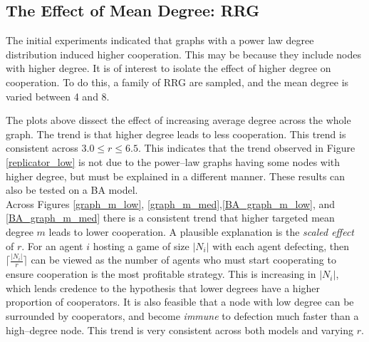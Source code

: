 \subsection{The Effect of Mean Degree: RRG}
The initial experiments indicated that graphs with a power law degree distribution induced higher cooperation. This may be because they include nodes with higher degree. It is of interest to isolate the effect of higher degree on cooperation. To do this, a family of RRG are sampled, and the mean degree is varied between 4 and 8. \\


 \FloatBarrier

 \FloatBarrier

The plots above dissect the effect of increasing average degree across the whole graph. The trend is that higher degree leads to less cooperation. This trend is consistent across $3.0\leq r\leq6.5$. This indicates that the trend observed in Figure \ref{replicator_low} is not due to the power--law graphs having some nodes with higher degree, but must be explained in a different manner. These results can also be tested on a BA model. \\
\FloatBarrier
{}
\FloatBarrier
{}
\FloatBarrier
Across Figures \ref{graph_m_low}, \ref{graph_m_med},\ref{BA_graph_m_low}, and \ref{BA_graph_m_med} there is a consistent trend that higher targeted mean degree $m$ leads to lower cooperation. A plausible explanation is the \emph{scaled effect} of $r$. For an agent $i$ hosting a game of size $|N_i|$ with each agent defecting, then $\lceil \frac{|N_i|}{r}\rceil$ can be viewed as the number of agents who must start cooperating to ensure cooperation is the most profitable strategy. This is increasing in $|N_i|$, which lends credence to the hypothesis that lower degrees have a higher proportion of cooperators. It is also feasible that a node with low degree can be surrounded by cooperators, and become \emph{immune} to defection much faster than a high--degree node. This trend is very consistent across both models and varying $r$. \\

